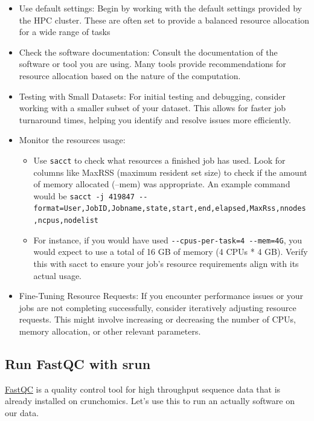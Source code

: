 \documentclass[
  letterpaper,
  DIV=11,
  numbers=noendperiod]{scrreprt}
\providecommand{\tightlist}{%
  \setlength{\itemsep}{0pt}\setlength{\parskip}{0pt}}\usepackage{longtable,booktabs,array}
\begin{document}
\begin{itemize}
\tightlist
\item
  Use default settings: Begin by working with the default settings
  provided by the HPC cluster. These are often set to provide a balanced
  resource allocation for a wide range of tasks
\item
  Check the software documentation: Consult the documentation of the
  software or tool you are using. Many tools provide recommendations for
  resource allocation based on the nature of the computation.
\item
  Testing with Small Datasets: For initial testing and debugging,
  consider working with a smaller subset of your dataset. This allows
  for faster job turnaround times, helping you identify and resolve
  issues more efficiently.
\item
  Monitor the resources usage:

  \begin{itemize}
  \tightlist
  \item
    Use \texttt{sacct} to check what resources a finished job has used.
    Look for columns like MaxRSS (maximum resident set size) to check if
    the amount of memory allocated (--mem) was appropriate. An example
    command would be
    \texttt{sacct\ -j\ 419847\ -\/-format=User,JobID,Jobname,state,start,end,elapsed,MaxRss,nnodes,ncpus,nodelist}
  \item
    For instance, if you would have used
    \texttt{-\/-cpus-per-task=4\ -\/-mem=4G}, you would expect to use a
    total of 16 GB of memory (4 CPUs * 4 GB). Verify this with sacct to
    ensure your job's resource requirements align with its actual usage.
  \end{itemize}
\item
  Fine-Tuning Resource Requests: If you encounter performance issues or
  your jobs are not completing successfully, consider iteratively
  adjusting resource requests. This might involve increasing or
  decreasing the number of CPUs, memory allocation, or other relevant
  parameters.
\end{itemize}

\subsection{Run FastQC with srun}\label{run-fastqc-with-srun}

\href{https://www.bioinformatics.babraham.ac.uk/projects/fastqc/}{FastQC}
is a quality control tool for high throughput sequence data that is
already installed on crunchomics. Let's use this to run an actually
software on our data.
\end{document}
